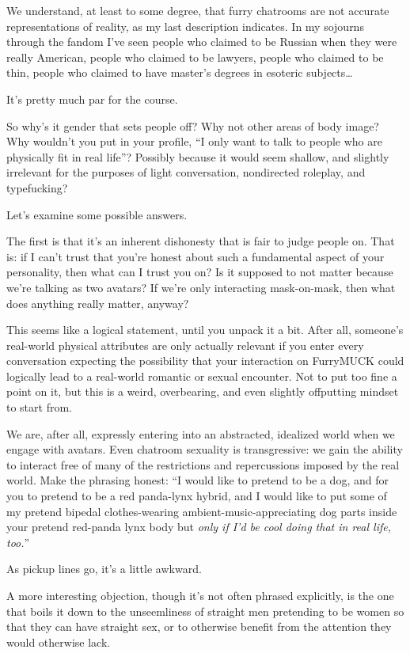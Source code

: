 We understand, at least to some degree, that furry chatrooms are not accurate representations of reality, as my last description indicates. In my sojourns through the fandom I’ve seen people who claimed to be Russian when they were really American, people who claimed to be lawyers, people who claimed to be thin, people who claimed to have master’s degrees in esoteric subjects…

It’s pretty much par for the course.

So why’s it gender that sets people off? Why not other areas of body image? Why wouldn’t you put in your profile, ``I only want to talk to people who are physically fit in real life''? Possibly because it would seem shallow, and slightly irrelevant for the purposes of light conversation, nondirected roleplay, and typefucking?

Let’s examine some possible answers.

The first is that it’s an inherent dishonesty that is fair to judge people on. That is: if I can’t trust that you’re honest about such a fundamental aspect of your personality, then what can I trust you on? Is it supposed to not matter because we’re talking as two avatars? If we’re only interacting mask-on-mask, then what does anything really matter, anyway?

This seems like a logical statement, until you unpack it a bit. After all, someone’s real-world physical attributes are only actually relevant if you enter every conversation expecting the possibility that your interaction on FurryMUCK could logically lead to a real-world romantic or sexual encounter. Not to put too fine a point on it, but this is a weird, overbearing, and even slightly offputting mindset to start from.

We are, after all, expressly entering into an abstracted, idealized world when we engage with avatars. Even chatroom sexuality is transgressive: we gain the ability to interact free of many of the restrictions and repercussions imposed by the real world. Make the phrasing honest: ``I would like to pretend to be a dog, and for you to pretend to be a red panda-lynx hybrid, and I would like to put some of my pretend bipedal clothes-wearing ambient-music-appreciating dog parts inside your pretend red-panda lynx body but \textit{only if I’d be cool doing that in real life, too.}''

As pickup lines go, it’s a little awkward.

A more interesting objection, though it’s not often phrased explicitly, is the one that boils it down to the unseemliness of straight men pretending to be women so that they can have straight sex, or to otherwise benefit from the attention they would otherwise lack.

